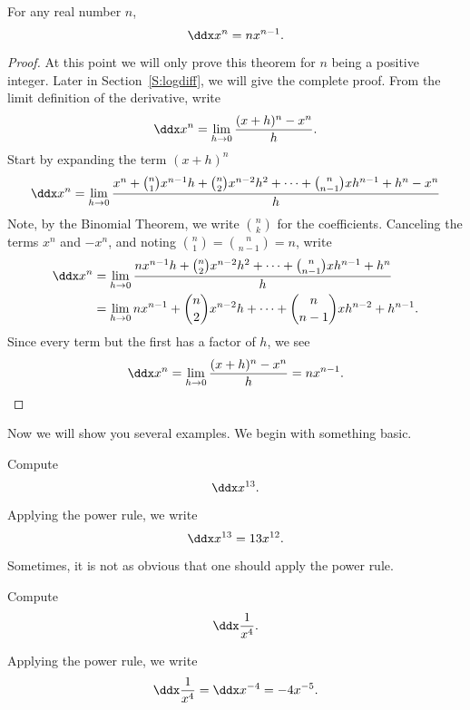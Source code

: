 \begin{mainTheorem}\label{T:powerrule}
For any real number $n$, 
\[
\ddx x^n = n x^{n-1}.
\]
\end{mainTheorem}
\begin{proof}
At this point we will only prove this theorem for $n$ being a positive
integer. Later in Section~\ref{S:logdiff}, we will give the complete proof. From the limit
definition of the derivative, write
\[
\ddx x^n = \lim_{ h\to0} \frac{(x+ h)^n-x^n}{h}.
\]
Start by expanding the term $(x+h)^n$
\[
\ddx x^n=\lim_{h\to0} \frac{x^n + \binom{n}{1}x^{n-1} h + \binom{n}{2}x^{n-2} h^2+\cdots+\binom{n}{n-1}x h^{n-1} +  h^n-x^n}{h}
\]
Note, by the Binomial Theorem, we write $\binom{n}{k}$ for the
coefficients. Canceling the terms $x^n$ and $-x^n$, and noting
$\binom{n}{1}= \binom{n}{n-1}= n$, write
\begin{align*}
\ddx x^n&=\lim_{h\to0} \frac{nx^{n-1} h + \binom{n}{2}x^{n-2} h^2+\cdots+\binom{n}{n-1}x h^{n-1} +  h^n}{h} \\
&=\lim_{h\to0} nx^{n-1} + \binom{n}{2}x^{n-2} h+\cdots+\binom{n}{n-1}x h^{n-2} +  h^{n-1}.
\end{align*}
Since every term but the first has a factor of $h$, we see
\[
\ddx x^n = \lim_{ h\to0}\frac{(x+ h)^n-x^n}{h} = nx^{n-1}.
\]
\end{proof}

Now we will show you several examples. We begin with something basic.

\begin{example}
Compute
\[
\ddx x^{13}.
\]
\end{example}
\begin{solution}
Applying the power rule, we write
\[
\ddx x^{13} = 13x^{12}.
\]
\end{solution}

Sometimes, it is not as obvious that one should apply the power rule.

\begin{example}
Compute
\[
\ddx \frac{1}{x^4}.
\]
\end{example}
\begin{solution}
Applying the power rule, we write
\[
\ddx \frac{1}{x^4} = \ddx x^{-4} = -4x^{-5}.
\]
\end{solution}

